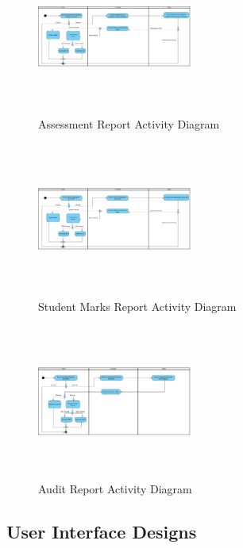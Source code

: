 \documentclass[12pt]{article}
\begin{document}
						\begin{figure}[h]
										\centering
										\includegraphics[width=2in, height=2in]{Pictures/AssessmentReportActivityDiagram.jpg}
										\caption{Assessment Report Activity Diagram}
						\end{figure}
						\begin{figure}[h]
										\centering
										\includegraphics[width=2in, height=2in]{Pictures/StudentMarksReport.jpg}
										\caption{Student Marks Report Activity Diagram}
						\end{figure}
						\begin{figure}[h]
										\centering
										\includegraphics[width=2in, height=2in]{Pictures/AuditReportActivityDiagram.jpg}
										\caption{Audit Report Activity Diagram}
						\end{figure}
				\vspace{0.2in}
		
		\subsection{User Interface Designs} %
				\vspace{0.2in}
		
\end{document}
